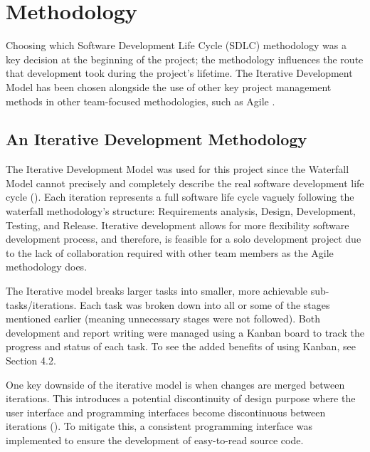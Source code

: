 \chapter{Methodology}
\label{chap:methodology}

Choosing which Software Development Life Cycle (SDLC) methodology was a key decision at the beginning of the project; the methodology influences the route that development took during the project's lifetime. The Iterative Development Model has been chosen alongside the use of other key project management methods in other team-focused methodologies, such as Agile .

\section{An Iterative Development Methodology}
\label{methodology:chosen}

The Iterative Development Model was used for this project since the Waterfall Model cannot precisely and completely describe the real software development life cycle (\cite{dapeng_liu_case_2011}).
Each iteration represents a full software life cycle vaguely following the waterfall methodology's structure: Requirements analysis, Design, Development, Testing, and Release. Iterative development allows for more flexibility software development process, and therefore, is feasible for a solo development project due to the lack of collaboration required with other team members as the Agile methodology does.


The Iterative model breaks larger tasks into smaller, more achievable sub-tasks/iterations. Each task was broken down into all or some of the stages mentioned earlier (meaning unnecessary stages were not followed). Both development and report writing were managed using a Kanban board to track the progress and status of each task. To see the added benefits of using Kanban, see Section 4.2.

One key downside of the iterative model is when changes are merged between iterations. This introduces a potential discontinuity of design purpose where the user interface and programming interfaces become discontinuous between iterations (\cite{dapeng_liu_case_2011}). To mitigate this, a consistent programming interface was implemented to ensure the development of easy-to-read source code.
